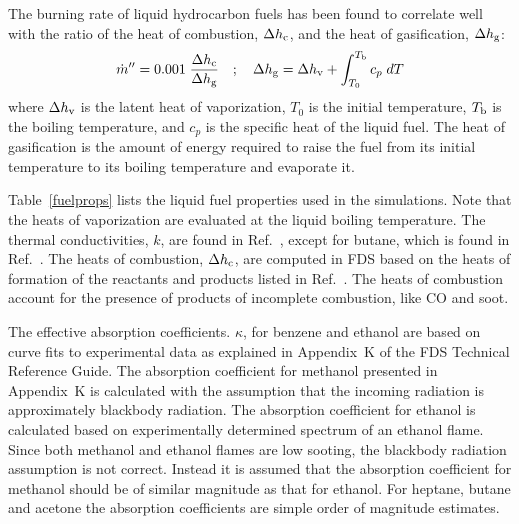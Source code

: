 The burning rate of liquid hydrocarbon fuels has been found to correlate well with the ratio of the heat of combustion, $\Delta h_{\rm c}$, and the heat of gasification, $\Delta h_{\rm g}$:
\begin{equation}
\dot{m}''= 0.001 \; \frac{\Delta h_{\rm c}}{\Delta h_{\rm g}} \quad ; \quad \Delta h_{\rm g} = \Delta h_{\rm v} + \int_{T_0}^{T_{\rm b}} c_p \; dT
\label{poolcorr}
\end{equation}
where $\Delta h_{\rm v}$ is the latent heat of vaporization, $T_0$ is the initial temperature, $T_{\rm b}$ is the boiling temperature, and $c_p$ is the specific heat of the liquid fuel. The heat of gasification is the amount of energy required to raise the fuel from its initial temperature to its boiling temperature and evaporate it. 

Table~\ref{fuelprops} lists the liquid fuel properties used in the simulations. Note that the heats of vaporization are evaluated at the liquid boiling temperature. The thermal conductivities, $k$, are found in Ref.~\cite{CRCHandbook}, except for butane, which is found in Ref.~\cite{Webbook:FluidThermo}. The heats of combustion, $\Delta h_{\rm c}$, are computed in FDS based on the heats of formation of the reactants and products listed in Ref.~\cite{NIST_JANAF}. The heats of combustion account for the presence of products of incomplete combustion, like CO and soot.

The effective absorption coefficients. $\kappa$, for benzene and ethanol are based on curve fits to experimental data as explained in Appendix~K of the FDS Technical Reference Guide. The absorption coefficient for methanol presented in Appendix~K is calculated with the assumption that the incoming radiation is approximately blackbody radiation. The absorption coefficient for ethanol is calculated based on experimentally determined spectrum of an ethanol flame. Since both methanol and ethanol flames are low sooting, the blackbody radiation assumption is not correct. Instead it is assumed that the absorption coefficient for methanol should be of similar magnitude as that for ethanol. For heptane, butane and acetone the absorption coefficients are simple order of magnitude estimates.

